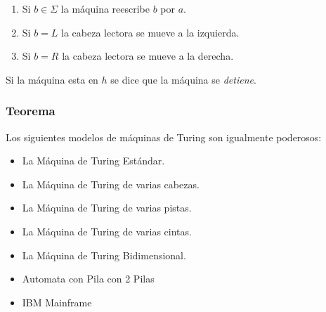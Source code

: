 \begin{enumerate}
\item {\color{red} Si $b\in\Sigma$ } la máquina reescribe $b$ por $a$.
\item {\color{red} Si $b=L$ } la cabeza lectora se mueve a la izquierda.
\item {\color{red} Si $b=R$ } la cabeza lectora se mueve a la derecha.
\end{enumerate}
\begin{center}
{\color{red}  Si la máquina esta en $h$} se dice que la máquina se \textit{detiene}.
\end{center}
\subsubsection*{Teorema}
Los siguientes modelos de máquinas de Turing son igualmente poderosos:
\begin{itemize}
\item La Máquina de Turing Estándar.
\item La Máquina de Turing de varias cabezas.
\item La Máquina de Turing de varias pistas.
\item La Máquina de Turing de varias cintas.
\item La Máquina de Turing Bidimensional.
\item Automata con Pila con 2 Pilas
\item IBM Mainframe
\end{itemize}